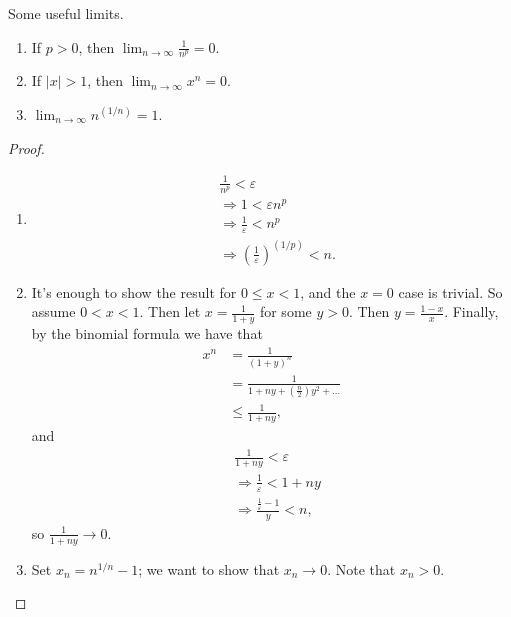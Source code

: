 \documentclass{notes}
\begin{document}
\begin{theorem}\leavevmode
  Some useful limits.
  \begin{enumerate}
    \item If $p > 0$, then $\lim_{n\to\infty} \frac{1}{n^p} = 0$.
    \item If $|x| > 1$, then $\lim_{n\to\infty} x^n = 0$.
    \item $\lim_{n\to\infty} n^{(1/n)} = 1$.  
  \end{enumerate}
\end{theorem}
\begin{proof}\leavevmode
  \begin{enumerate}
    \item 
      \begin{align*}
        &\frac{1}{n^p} < \varepsilon \\
        &\Rightarrow 1 < \varepsilon n^p \\
        &\Rightarrow \frac{1}{\varepsilon} < n^p \\
        &\Rightarrow \left( \frac{1}{\varepsilon} \right)^{(1/p)} < n.
      \end{align*}

    \item It's enough to show the result for $0 \leq x < 1$, and the $x = 0$ case is trivial. So assume
      $0 < x < 1$. Then let $x = \frac{1}{1 + y}$ for some $y > 0$. Then $y = \frac{1 - x}{x}$. Finally,
      by the binomial formula we have that
      \begin{align*}
        x^n &= \frac{1}{(1 + y)^n} \\
            &= \frac{1}{1 + ny + (\frac{n}{2}) y^2 + \ldots} \\
            &\leq \frac{1}{1 + ny},
      \end{align*}
      and 
      \begin{align*}
        &\frac{1}{1 + ny} < \varepsilon \\
        &\Rightarrow \frac{1}{\varepsilon} < 1 + ny \\
        &\Rightarrow \frac{\frac{1}{\varepsilon} - 1}{y} < n,
      \end{align*}
      so $\frac{1}{1 + ny} \to 0$.

    \item Set $x_n = n^{1/n} - 1$; we want to show that $x_n \to 0$. Note that $x_n > 0$.
    
  \end{enumerate}
\end{proof}
\end{document}
